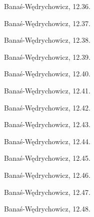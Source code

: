 \begin{multicols}{2}
\begin{problem}
    Banaś-Wędrychowicz, 12.36.
\end{problem}

\begin{problem}
    Banaś-Wędrychowicz, 12.37.
\end{problem}

\begin{problem}
    Banaś-Wędrychowicz, 12.38.
\end{problem}

\begin{problem}
    Banaś-Wędrychowicz, 12.39.
\end{problem}

\begin{problem}
    Banaś-Wędrychowicz, 12.40.
\end{problem}

\begin{problem}
    Banaś-Wędrychowicz, 12.41.
\end{problem}

\begin{problem}
    Banaś-Wędrychowicz, 12.42.
\end{problem}

\begin{problem}
    Banaś-Wędrychowicz, 12.43.
\end{problem}

\begin{problem}
    Banaś-Wędrychowicz, 12.44.
\end{problem}

\begin{problem}
    Banaś-Wędrychowicz, 12.45.
\end{problem}

\begin{problem}
    Banaś-Wędrychowicz, 12.46.
\end{problem}

\begin{problem}
    Banaś-Wędrychowicz, 12.47.
\end{problem}

\begin{problem}
    Banaś-Wędrychowicz, 12.48.
\end{problem}


\end{multicols}
